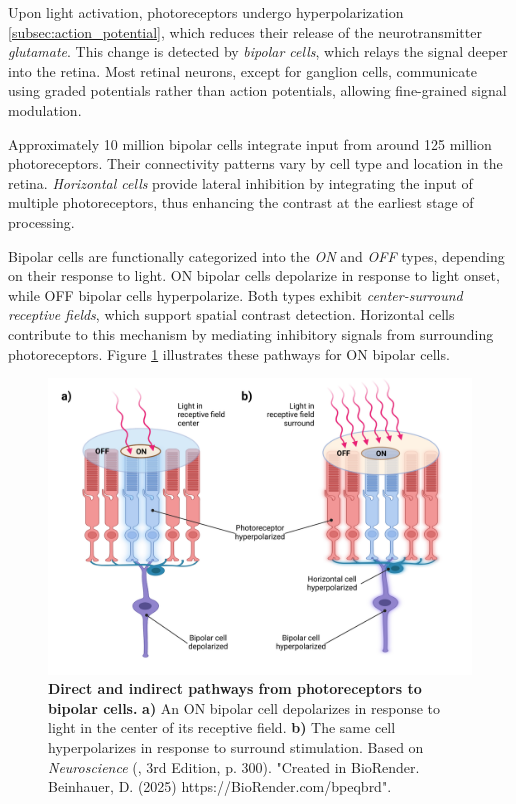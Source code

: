 Upon light activation, photoreceptors undergo hyperpolarization \ref{subsec:action_potential}, which reduces their release of the neurotransmitter \emph{glutamate}. This change is detected by \emph{bipolar cells}, which relays the signal deeper into the retina. Most retinal neurons, except for ganglion cells, communicate using graded potentials rather than action potentials, allowing fine-grained signal modulation.

Approximately 10 million bipolar cells integrate input from around 125 million photoreceptors. Their connectivity patterns vary by cell type and location in the retina. \emph{Horizontal cells} provide lateral inhibition by integrating the input of multiple photoreceptors, thus enhancing the contrast at the earliest stage of processing.

Bipolar cells are functionally categorized into the \emph{ON} and \emph{OFF} types, depending on their response to light. ON bipolar cells depolarize in response to light onset, while OFF bipolar cells hyperpolarize. Both types exhibit \emph{center-surround receptive fields}, which support spatial contrast detection. Horizontal cells contribute to this mechanism by mediating inhibitory signals from surrounding photoreceptors. Figure \ref{fig:on_off_cells} illustrates these pathways for ON bipolar cells.

\begin{figure}
    \centering
    \includegraphics[width=\linewidth]{img/on_off_cells.pdf}
    \caption{\textbf{Direct and indirect pathways from photoreceptors to bipolar cells.} \textbf{a)} An ON bipolar cell depolarizes in response to light in the center of its receptive field. \textbf{b)} The same cell hyperpolarizes in response to surround stimulation. Based on \emph{Neuroscience} (\citet{bear2020neuroscience}, 3rd Edition, p. 300). "Created in BioRender. Beinhauer, D. (2025) https://BioRender.com/bpeqbrd".}
    \label{fig:on_off_cells}
\end{figure}

